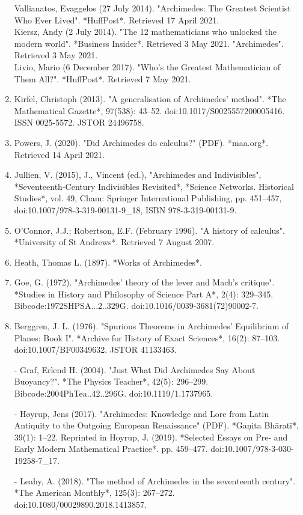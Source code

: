\begin{enumerate}
Vallianatos, Evaggelos (27 July 2014). "Archimedes: The Greatest Scientist Who Ever Lived". *HuffPost*. Retrieved 17 April 2021.\\
Kiersz, Andy (2 July 2014). "The 12 mathematicians who unlocked the modern world". *Business Insider*. Retrieved 3 May 2021.  
  "Archimedes". Retrieved 3 May 2021.\\
Livio, Mario (6 December 2017). "Who's the Greatest Mathematician of Them All?". *HuffPost*. Retrieved 7 May 2021.
\item Kirfel, Christoph (2013). "A generalisation of Archimedes' method". *The Mathematical Gazette*, 97(538): 43–52. doi:10.1017/S0025557200005416. ISSN 0025-5572. JSTOR 24496758.
\item Powers, J. (2020). "Did Archimedes do calculus?" (PDF). *maa.org*. Retrieved 14 April 2021.
\item Jullien, V. (2015), J., Vincent (ed.), "Archimedes and Indivisibles", *Seventeenth-Century Indivisibles Revisited*, *Science Networks. Historical Studies*, vol. 49, Cham: Springer International Publishing, pp. 451–457, doi:10.1007/978-3-319-00131-9_18, ISBN 978-3-319-00131-9.
\item O'Connor, J.J.; Robertson, E.F. (February 1996). "A history of calculus". *University of St Andrews*. Retrieved 7 August 2007.
\item Heath, Thomas L. (1897). *Works of Archimedes*.
\item Goe, G. (1972). "Archimedes' theory of the lever and Mach's critique". *Studies in History and Philosophy of Science Part A*, 2(4): 329–345. Bibcode:1972SHPSA...2..329G. doi:10.1016/0039-3681(72)90002-7.

\item Berggren, J. L. (1976). "Spurious Theorems in Archimedes' Equilibrium of Planes: Book I". *Archive for History of Exact Sciences*, 16(2): 87–103. doi:10.1007/BF00349632. JSTOR 41133463.

- Graf, Erlend H. (2004). "Just What Did Archimedes Say About Buoyancy?". *The Physics Teacher*, 42(5): 296–299. Bibcode:2004PhTea..42..296G. doi:10.1119/1.1737965.

- Høyrup, Jens (2017). "Archimedes: Knowledge and Lore from Latin Antiquity to the Outgoing European Renaissance" (PDF). *Gaņita Bhāratī*, 39(1): 1–22. Reprinted in Hoyrup, J. (2019). *Selected Essays on Pre- and Early Modern Mathematical Practice*. pp. 459–477. doi:10.1007/978-3-030-19258-7_17.

- Leahy, A. (2018). "The method of Archimedes in the seventeenth century". *The American Monthly*, 125(3): 267–272. doi:10.1080/00029890.2018.1413857.
\end{enumerate}